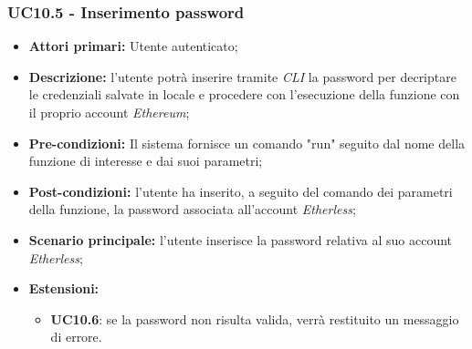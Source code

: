 \subsubsection{UC10.5 - Inserimento password}
\begin{itemize}
	\item \textbf{Attori primari:} Utente autenticato;
	\item \textbf{Descrizione:} l'utente potrà inserire tramite \textit{CLI\glo} la password per decriptare le credenziali salvate in locale e procedere con l'esecuzione della funzione con il proprio account \textit{Ethereum\glos}; 
	\item \textbf{Pre-condizioni:} Il sistema fornisce un comando "run" seguito dal nome della funzione di interesse e dai suoi parametri;
	\item \textbf{Post-condizioni:} l'utente ha inserito, a seguito del comando dei parametri della funzione, la password associata all'account \textit{Etherless};
	\item \textbf{Scenario principale:} l'utente inserisce la password relativa al suo account \textit{Etherless};
	\item \textbf{Estensioni:} 
	\begin{itemize}
		\item \textbf{UC10.6}: se la password non risulta valida, verrà restituito un messaggio di errore.
	\end{itemize}
\end{itemize}